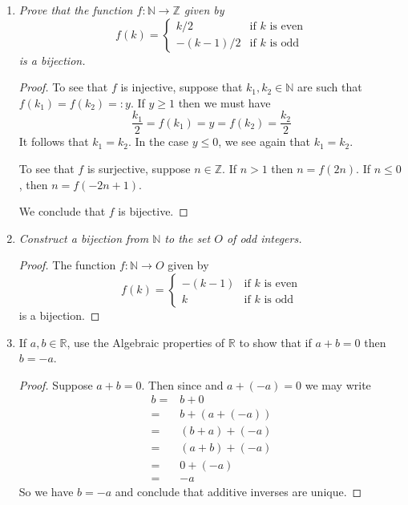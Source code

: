 \documentclass[12pt, reqno]{article}
\numberwithin{equation}{section}
\theoremstyle{definition}
\theoremstyle{remark}
\newcommand{\NN}{\mathbb{N}}
\newcommand{\RR}{\mathbb{R}}
\newcommand{\ZZ}{\mathbb{Z}}
\begin{document}
\begin{enumerate}[leftmargin=*]
	\item \emph{Prove that the function $f:\NN\to \ZZ$ given by
		      \[
			      f(k) = \begin{cases}
				      k/2      & \text{if $k$ is even} \\
				      -(k-1)/2 & \text{if $k$ is odd}
			      \end{cases}
		      \]
		      is a bijection.}

	      \begin{proof}
		      To see that $f$ is injective, suppose that $k_1, k_2\in \NN$ are such that $f(k_1) = f(k_2) =: y$. If $y \geq 1$ then we must have
		      \[
			      \frac{k_1}{2} = f(k_1) = y =f(k_2) = \frac{k_2}{2}
		      \]
		      It follows that $k_1= k_2$. In the case $y\leq 0$, we see again that $k_1 = k_2$.

		      To see that $f$ is surjective, suppose $n\in\ZZ$. If $n > 1$ then $n = f(2n)$. If $n \leq 0$, then $n = f(-2n+1)$.

		      We conclude that $f$ is bijective.
	      \end{proof}

	\item \emph{Construct a bijection from $\NN$ to the set $O$ of odd integers.}

	      \begin{proof}
		      The function $f:\NN \to O$ given by
		      \[
			      f(k) = \begin{cases}
				      -(k-1) & \text{if $k$ is even} \\
				      k      & \text{if $k$ is odd}
			      \end{cases}
		      \]
		      is a bijection.
	      \end{proof}

	\item If $a,b\in\RR$, use the Algebraic properties of $\RR$ to show that if $a+b = 0$ then $b = -a$.

	      \begin{proof}
		      Suppose $a + b = 0$. Then since and $a + (-a) = 0$ we may write
		      \begin{align*}
			      b
			      = & b + 0 \tag{A3 : existence of a zero element} \\
			      = & b + (a+(-a))                                 \\
			      = & (b+a) + (-a) \tag{A2 : associativity}        \\
			      = & (a+b) + (-a) \tag{A1 : commutativity}        \\
			      = & 0 + (-a)                                     \\
			      = & -a \tag{A3 : existence of a zero element}
		      \end{align*}
		      So we have $b = -a$ and conclude that additive inverses are unique.
	      \end{proof}


\end{enumerate}
\end{document}
